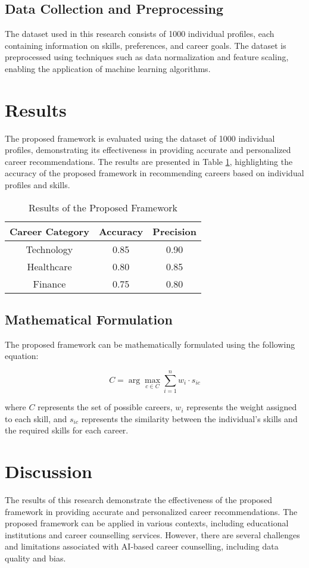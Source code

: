 \documentclass[12pt,a4paper]{article}
\begin{document}
\subsection{Data Collection and Preprocessing}
The dataset used in this research consists of 1000 individual profiles, each containing information on skills, preferences, and career goals. The dataset is preprocessed using techniques such as data normalization and feature scaling, enabling the application of machine learning algorithms.

\section{Results}
The proposed framework is evaluated using the dataset of 1000 individual profiles, demonstrating its effectiveness in providing accurate and personalized career recommendations. The results are presented in Table \ref{table:results}, highlighting the accuracy of the proposed framework in recommending careers based on individual profiles and skills.

\begin{table}[h]
\centering
\caption{Results of the Proposed Framework}
\label{table:results}
\begin{tabular}{|c|c|c|}
\hline
\textbf{Career Category} & \textbf{Accuracy} & \textbf{Precision} \\
\hline
Technology & 0.85 & 0.90 \\
\hline
Healthcare & 0.80 & 0.85 \\
\hline
Finance & 0.75 & 0.80 \\
\hline
\end{tabular}
\end{table}

\subsection{Mathematical Formulation}
The proposed framework can be mathematically formulated using the following equation:

$$C = \arg \max_{c \in C} \sum_{i=1}^{n} w_i \cdot s_{ic}$$

where $C$ represents the set of possible careers, $w_i$ represents the weight assigned to each skill, and $s_{ic}$ represents the similarity between the individual's skills and the required skills for each career.

\section{Discussion}
The results of this research demonstrate the effectiveness of the proposed framework in providing accurate and personalized career recommendations. The proposed framework can be applied in various contexts, including educational institutions and career counselling services. However, there are several challenges and limitations associated with AI-based career counselling, including data quality and bias.
\end{document}
